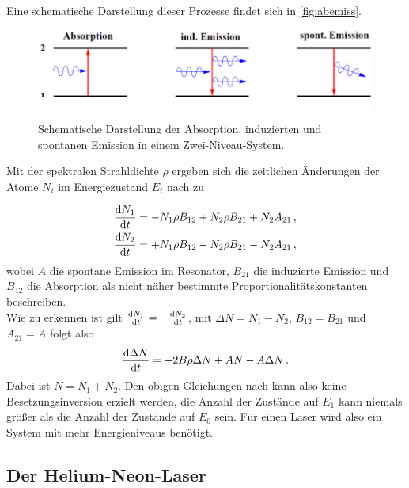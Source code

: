 Eine schematische Darstellung dieser Prozesse findet sich in \autoref{fig:abemiss}.

\begin{figure}[H]
    \centering
    \includegraphics{figures/Absorption_Emission.pdf}
    \caption{Schematische Darstellung der Absorption, induzierten und spontanen Emission in einem Zwei-Niveau-System.}
    \label{fig:abemiss}
\end{figure}

Mit der spektralen Strahldichte $\rho$ ergeben sich die zeitlichen Änderungen der Atome $N_i$ im Energiezustand $E_i$ nach \cite{dem01} zu

\begin{align}
    \frac{\mathrm{d} N_1}{\mathrm{d} t} &= - N_1 \rho B_{12} + N_2 \rho B_{21} + N_2 A_{21} \label{eq:dN1} \,, \\
    \frac{\mathrm{d} N_2}{\mathrm{d} t} &= + N_1 \rho B_{12} - N_2 \rho B_{21} - N_2 A_{21} \label{eq:dN2} \,, 
\end{align}
wobei $A$ die spontane Emission im Resonator, $B_{21}$ die induzierte Emission und $B_{12}$ die Absorption als nicht näher bestimmte Proportionalitätskonstanten beschreiben. \\
Wie zu erkennen ist gilt $\frac{\mathrm{d} N_1}{\mathrm{d} t} = -\frac{\mathrm{d} N_2}{\mathrm{d} t}$, mit $\Delta N = N_1 - N_2$, $B_{12} = B_{21}$ und $A_{21} = A$ folgt also
\begin{equation}
    \frac{\mathrm{d} \Delta N}{\mathrm{d} t} = - 2 B \rho \Delta N + A N - A \Delta N \,.
    \label{eq:deltaN}
\end{equation}
Dabei ist $N = N_1 + N_2$.
Den obigen Gleichungen nach kann also keine Besetzungsinversion erzielt werden, die Anzahl der Zustände auf $E_1$ kann niemals größer als die Anzahl der Zustände auf $E_0$ sein.
Für einen Laser wird also ein System mit mehr Energieniveaus benötigt.

\subsection{Der Helium-Neon-Laser}

